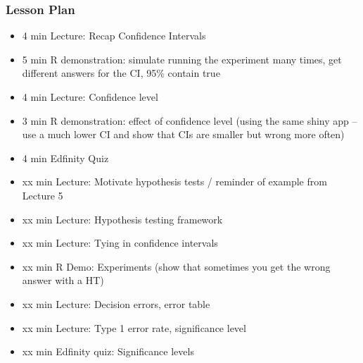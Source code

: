 \begin{frame}
    \frametitle{Lesson Plan}
    \begin{itemize}
        \item 4 min Lecture: Recap Confidence Intervals
        \item 5 min R demonstration: simulate running the experiment many times, get different answers for the CI, 95\% contain true
        \item 4 min Lecture: Confidence level
        \item 3 min R demonstration: effect of confidence level (using the same shiny app -- use a much lower CI and show that CIs are smaller but wrong more often)
        \item 4 min Edfinity Quiz
    
        \item xx min Lecture: Motivate hypothesis tests / reminder of example from Lecture 5
        \item xx min Lecture: Hypothesis testing framework
        \item xx min Lecture: Tying in confidence intervals
        \item xx min R Demo: Experiments (show that sometimes you get the wrong answer with a HT)
        \item xx min Lecture: Decision errors, error table
        
        \item xx min Lecture: Type 1 error rate, significance level
        \item xx min Edfinity quiz: Significance levels
        
    \end{itemize}
\end{frame}
    



    